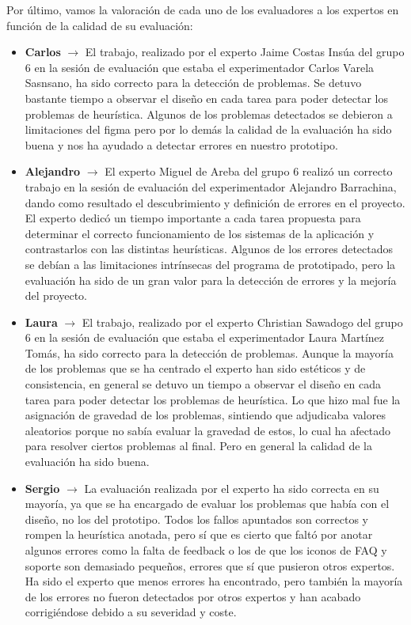 Por último, vamos la valoración de cada uno de los evaluadores a los expertos en función de la calidad de su evaluación:
\begin{itemize}
    \item \textbf{Carlos} $\rightarrow$ El trabajo, realizado por el experto Jaime Costas Insúa del grupo 6 en la sesión de evaluación que estaba el experimentador Carlos Varela Sasnsano, ha sido correcto para la detección de problemas. Se detuvo bastante tiempo a observar el diseño en cada tarea para poder detectar los problemas de heurística. Algunos de los problemas detectados se debieron a limitaciones del figma pero por lo demás la calidad de la evaluación ha sido buena y nos ha ayudado a detectar errores en nuestro prototipo.
    \item \textbf{Alejandro} $\rightarrow$ El experto Miguel de Areba del grupo 6 realizó un correcto trabajo en la sesión de evaluación del experimentador Alejandro Barrachina, dando como resultado el descubrimiento y definición de errores en el proyecto. El experto dedicó un tiempo importante a cada tarea propuesta para determinar el correcto funcionamiento de los sistemas de la aplicación y contrastarlos con las distintas heurísticas. Algunos de los errores detectados se debían a las limitaciones intrínsecas del programa de prototipado, pero la evaluación ha sido de un gran valor para la detección de errores y la mejoría del proyecto.
    \item \textbf{Laura} $\rightarrow$ El trabajo, realizado por el experto Christian Sawadogo del grupo 6 en la sesión de evaluación que estaba el experimentador Laura Martínez Tomás, ha sido correcto para la detección de problemas. Aunque la mayoría de los problemas que se ha centrado el experto han sido estéticos y de consistencia, en general se detuvo un tiempo a observar el diseño en cada tarea para poder detectar los problemas de heurística. Lo que hizo mal fue la asignación de gravedad de los problemas, sintiendo que adjudicaba valores aleatorios porque no sabía evaluar la gravedad de estos, lo cual ha afectado para resolver ciertos problemas al final. Pero en general la calidad de la evaluación ha sido buena.
    \item \textbf{Sergio} $\rightarrow$ La evaluación realizada por el experto ha sido correcta en su mayoría, ya que se ha encargado de evaluar los problemas que había con el diseño, no los del prototipo. Todos los fallos apuntados son correctos y rompen la heurística anotada, pero sí que es cierto que faltó por anotar algunos errores como la falta de feedback o los de que los iconos de FAQ y soporte son demasiado pequeños, errores que sí que pusieron otros expertos. Ha sido el experto que menos errores ha encontrado, pero también la mayoría de los errores no fueron detectados por otros expertos y han acabado corrigiéndose debido a su severidad y coste.

\end{itemize}
